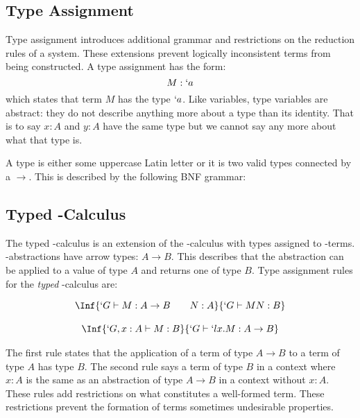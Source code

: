   \subsection{Type Assignment}
  
  Type assignment introduces additional grammar and restrictions on
  the reduction rules of a system. These extensions prevent logically
  inconsistent terms from being constructed. A type assignment has the
  form:
  \[
    M : `a 
  \]
  which states that term $M$ has the type $`a$. Like variables, type 
  variables are abstract: they do not describe anything more about a 
  type than its identity. That is to say $x: A$ and $y : A$ have the
  same type but we cannot say any more about what that type is.
 
  A type is either some uppercase Latin letter or it is two valid types
  connected by a $\rightarrow$. This is described by the following
  BNF grammar:
  
  
  \subsection{Typed \lam-Calculus}
  The typed \lam-calculus is an extension of the \lam-calculus with types assigned to \lam-terms.
  \lam-abstractions have arrow types: $A \to B$.
  This describes that the abstraction can be applied to a value of type $A$ and returns one of type $B$.
  Type assignment rules for the \emph{typed} \lam-calculus are:

  \[
    \begin{array}{c}
    \Inf{
      `G \vdash M : A \to B \hspace{20pt} N:A 
    }{
      `G \vdash M N : B 
    }
    \\
    \\
    \Inf{
      `G,x:A \vdash M : B
    }{
      `G \vdash `lx.M : A \to B 
    }
    \end{array}
  \]

  The first rule states that the application of a term of type $A \to B$ to
  a term of type $A$ has type $B$. 
  The second rule says a term of type $B$ in a context where $x:A$ is the same as an abstraction of type $A \to B$ in a context without $x:A$. 
  These rules add restrictions on what constitutes a well-formed term.
  These restrictions prevent the formation of terms sometimes undesirable properties.  
  
